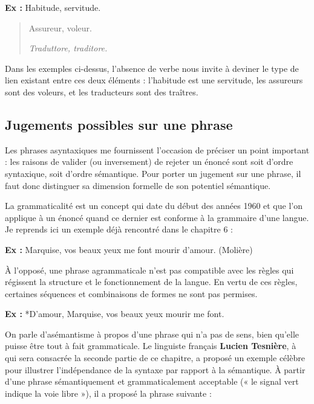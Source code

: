 \noindent\textbf{Ex :} Habitude, servitude.
\begin{quote}
Assureur, voleur.

\textit{Traduttore, traditore.}
\end{quote}
Dans les exemples ci-dessus, l’absence de verbe nous invite à deviner le type de lien existant entre ces deux éléments : l’habitude est une servitude, les assureurs sont des voleurs, et les traducteurs sont des traîtres.

\subsection{Jugements possibles sur une phrase}
Les phrases asyntaxiques me fournissent l’occasion de préciser un point important : les raisons de valider (ou inversement) de rejeter un énoncé sont soit d’ordre syntaxique, soit d’ordre sémantique. Pour porter un jugement sur une phrase, il faut donc distinguer sa dimension formelle de son potentiel sémantique.

La grammaticalité est un concept qui date du début des années 1960 et que l’on applique à un énoncé quand ce dernier est conforme à la grammaire d’une langue. Je reprends ici un exemple déjà rencontré dans le chapitre 6 :

\noindent\textbf{Ex :} Marquise, vos beaux yeux me font mourir d’amour. (Molière)

À l’opposé, une phrase agrammaticale n’est pas compatible avec les règles qui régissent la structure et le fonctionnement de la langue. En vertu de ces règles, certaines séquences et combinaisons de formes ne sont pas permises.

\noindent\textbf{Ex :} *D’amour, Marquise, vos beaux yeux mourir me font.

On parle d’asémantisme à propos d’une phrase qui n’a pas de sens, bien qu’elle puisse être tout à fait grammaticale. Le linguiste français \textbf{Lucien Tesnière}, à qui sera consacrée la seconde partie de ce chapitre, a proposé un exemple célèbre pour illustrer l’indépendance de la syntaxe par rapport à la sémantique. À partir d’une phrase sémantiquement et grammaticalement acceptable (« le signal vert indique la voie libre »), il a proposé la phrase suivante :

